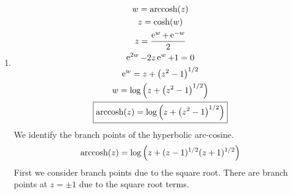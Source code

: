 {\begin{Solution}
\begin{enumerate}
\begin{gather*}
      z = \frac{ \left( \e^{w} - \e^{-w} \right)/2 }
      { \left( \e^{w} + \e^{-w} \right)/2 } 
      \\
      z \e^{w} + z \e^{-w} = \e^{w} - \e^{-w} 
      \\
      (z - 1) \e^{2 w} = -z - 1 
      \\
      \e^w = \left( \frac{-z - 1}{z - 1} \right)^{1/2} 
      \\
      w = \log \left( \frac{z + 1}{1 - z} \right)^{1/2} 
      \\
      \boxed{
        \arctanh(z) = \frac{1}{2} \log \left( \frac{1 + z}{1 - z} \right) 
        }
    \end{gather*}
    We identify the branch points of the hyperbolic arctangent.
    \[
    \arctanh(z) = \frac{1}{2} \left( \log(1 + z) - \log(1 - z) \right)
    \]
    There are branch points at $z = \pm 1$ due to the logarithm terms.
    We examine the point at infinity with the change of variables 
    $\zeta = 1 / z$.
    \begin{gather*}
      \arctanh(1/\zeta) = \frac{1}{2} \log \left( \frac{1 + 1/\zeta}{1 - 1/\zeta} \right) 
      \\
      \arctanh(1/\zeta) = \frac{1}{2} \log \left( \frac{\zeta + 1}{\zeta - 1} \right) 
    \end{gather*}
    As $\zeta \to 0$, the argument of the logarithm term tends to $-1$  The 
    logarithm does not have a branch point at that point.
    Since $\arctanh(1/\zeta)$ does not have a branch point at $\zeta = 0$,
    $\arctanh(z)$ does not have a branch point at infinity.
  \item
  \begin{gather*}
    w = \mathop{\mathrm{arccosh}}\nolimits(z)
    \\
    z = \cosh(w)
    \\
    z = \frac{ \mathop{\mathrm{e}}\nolimits^w + \mathop{\mathrm{e}}\nolimits^{-w} }{2}
    \\
    \mathop{\mathrm{e}}\nolimits^{2 w} - 2 z \mathop{\mathrm{e}}\nolimits^w + 1 = 0
    \\
    \mathop{\mathrm{e}}\nolimits^w = z + \left( z^2 - 1 \right)^{1/2}
    \\
    w = \log \left( z + \left( z^2 - 1 \right)^{1/2} \right)
    \\
    \boxed{
      \mathop{\mathrm{arccosh}}\nolimits(z) = \log \left( z + \left( z^2 - 1 \right)^{1/2} \right)
      }
  \end{gather*}
  We identify the branch points of the hyperbolic arc-cosine.
  \[
  \mathop{\mathrm{arccosh}}\nolimits(z) = \log \left( z + (z - 1)^{1/2} (z + 1)^{1/2} \right)
  \]
  First we consider branch points due to the square root.
  There are branch points at $z = \pm 1$ due to the square root terms.

\end{enumerate}
\end{Solution}}
